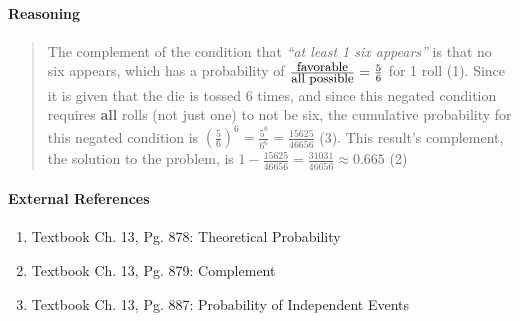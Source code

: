 \documentclass[letterpaper,12pt,twoside]{report}
\begin{document}
	\paragraph{Reasoning}
	\begin{quotation}
	
	The complement of the condition that \textit{``at least 1 six appears''} is that no six appears, which has a probability of $\frac{\textrm{\small{favorable}}}{\textrm{\small{all possible}}} = \frac{5}{6}$ for 1 roll (1). Since it is given that the die is tossed 6 times, and since this negated condition requires \textbf{all} rolls (not just one) to not be six, the cumulative probability for this negated condition is $(\frac{5}{6})^6 = \frac{5^6}{6^6} = \frac{15625}{46656}$ (3). This result's complement, the solution to the problem, is $1-\frac{15625}{46656} = \boxed{\frac{31031}{46656} \approx 0.665}$ (2) 
	
	\end{quotation}
	
	\paragraph{External References}
	
	\begin{enumerate}
		\item Textbook Ch. 13, Pg. 878: Theoretical Probability
		\item Textbook Ch. 13, Pg. 879: Complement
		\item Textbook Ch. 13, Pg. 887: Probability of Independent Events
	\end{enumerate}
\end{document}
